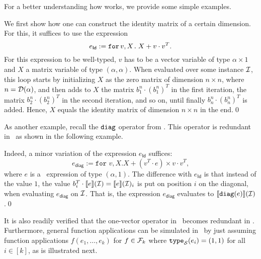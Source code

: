 For a better understanding how \langfor  works, we provide some simple examples.
\begin{example}
We first show how one can construct the identity matrix of a certain dimension. For this, it suffices to use the expression $$e_{\mathsf{Id}}:=\texttt{for}\, v,X \texttt{.}\, X + v\cdot v^T.$$ For this expression to be well-typed, $v$ has to be a vector variable of type $\alpha\times 1$ and $X$ a matrix variable of type $(\alpha,\alpha)$. When evaluated over some instance $\mathcal{I}$, this loop starts by initializing $X$ as the zero matrix of dimension $n\times n$, where $n=\mathcal{D}(\alpha)$, and then adds to $X$ the matrix $b_1^n\cdot (b_1^n)^T$ in the first iteration, the matrix $b_2^n\cdot (b_2^n)^T$ in the second iteration, and so on, until finally $b_n^n\cdot (b_n^n)^T$ is added. Hence, $X$ equals the identity matrix of dimension $n\times n$ in the end.\qed
\end{example}
As another example, recall the $\texttt{diag}$ operator from \lang.	This operator is redundant in \langfor\ as shown in the following example.
\begin{example}
Indeed, a minor variation of the expression $e_{\mathsf{Id}}$ suffices:
$$e_{\mathsf{diag}}:=\texttt{for } v, X. X + (v^T\cdot e) \times v\cdot v^T,$$ where $e$ is a \langfor\  expression of type $(\alpha,1)$. The difference with $e_{\mathsf{Id}}$ is that instead of the value $1$, the value 
$b_i^T\cdot\llbracket e \rrbracket(\mathcal{I})=\llbracket e \rrbracket(\mathcal{I})_{i}$ is put on position $i$ on the diagonal, when evaluating $e_{\mathsf{diag}}$ on $\mathcal{I}$.
That is, the expression $e_{\mathsf{diag}}$ evaluates to $\llbracket \texttt{diag}(e) \rrbracket(\mathcal{I})$.\qed
\end{example}
It is also readily verified that the one-vector operator in \lang\ becomes redundant in \langfor. Furthermore, general function applications can be simulated in \langfor\ by just assuming function applications $f(e_1,\ldots,e_k)$ for $f\in\mathcal{F}_k$ where $\texttt{type}_{\mathcal{S}}(e_i)=(1,1)$ for all $i\in[k]$, as is illustrated next.
